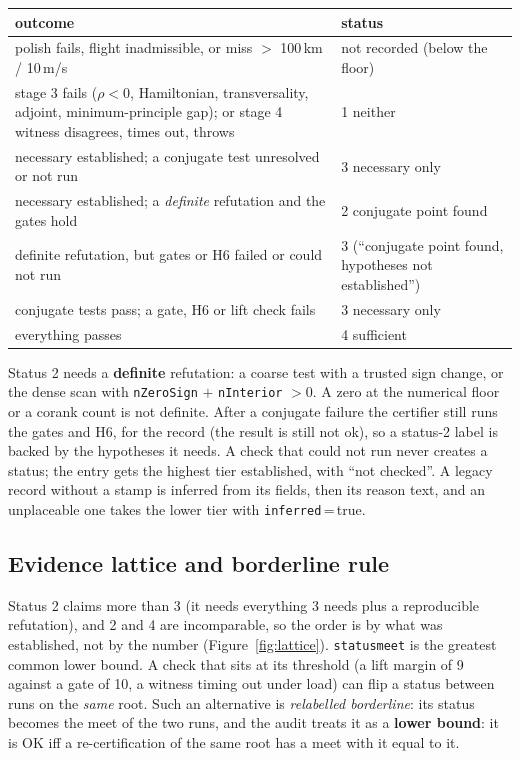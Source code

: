 \documentclass[11pt]{article}
\renewcommand{\_}{\textunderscore\allowbreak}
\newcommand{\code}[1]{\texttt{#1}}
\begin{document}
\begin{center}\small
\begin{tabular}{@{}L{0.58\textwidth}L{0.34\textwidth}@{}}
\toprule
outcome & status \\
\midrule
polish fails, flight inadmissible, or miss $>$ 100\,km / 10\,m/s & not recorded (below the floor) \\
stage 3 fails ($\rho<0$, Hamiltonian, transversality, adjoint, minimum-principle gap); or stage 4 witness disagrees, times out, throws & 1 neither \\
necessary established; a conjugate test unresolved or not run & 3 necessary only \\
necessary established; a \emph{definite} refutation and the gates hold & 2 conjugate point found \\
definite refutation, but gates or H6 failed or could not run & 3 (``conjugate point found, hypotheses not established'') \\
conjugate tests pass; a gate, H6 or lift check fails & 3 necessary only \\
everything passes & 4 sufficient \\
\bottomrule
\end{tabular}
\end{center}

\noindent Status 2 needs a \textbf{definite} refutation: a coarse test with a
trusted sign change, or the dense scan with \code{nZeroSign} $+$
\code{nInterior} $>0$. A zero at the numerical floor or a corank count is not
definite. After a conjugate failure the certifier still runs the gates and
H6, for the record (the result is still not ok), so a status-2 label is
backed by the hypotheses it needs. A check that could not run never creates a
status; the entry gets the highest tier established, with ``not checked''.
A legacy record without a stamp is inferred from its fields, then its reason
text, and an unplaceable one takes the lower tier with \code{inferred}\,=\,true.

\subsection{Evidence lattice and borderline rule}

Status 2 claims more than 3 (it needs everything 3 needs plus a reproducible
refutation), and 2 and 4 are incomparable, so the order is by what was
established, not by the number (Figure~\ref{fig:lattice}). \code{status\_meet}
is the greatest common lower bound. A check that sits at its threshold (a lift
margin of 9 against a gate of 10, a witness timing out under load) can flip a
status between runs on the \emph{same} root. Such an alternative is
\emph{relabelled borderline}: its status becomes the meet of the two runs, and
the audit treats it as a \textbf{lower bound}: it is OK iff a
re-certification of the same root has a meet with it equal to it.
\end{document}
